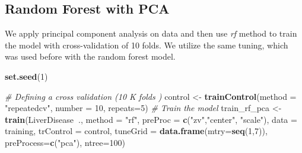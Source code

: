 \documentclass[]{article}
\newenvironment{Shaded}{\begin{snugshade}}{\end{snugshade}}
\newcommand{\CommentTok}[1]{\textcolor[rgb]{0.56,0.35,0.01}{\textit{#1}}}
\newcommand{\DataTypeTok}[1]{\textcolor[rgb]{0.13,0.29,0.53}{#1}}
\newcommand{\DecValTok}[1]{\textcolor[rgb]{0.00,0.00,0.81}{#1}}
\newcommand{\KeywordTok}[1]{\textcolor[rgb]{0.13,0.29,0.53}{\textbf{#1}}}
\newcommand{\NormalTok}[1]{#1}
\newcommand{\OperatorTok}[1]{\textcolor[rgb]{0.81,0.36,0.00}{\textbf{#1}}}
\newcommand{\StringTok}[1]{\textcolor[rgb]{0.31,0.60,0.02}{#1}}
\begin{document}
\subsection{Random Forest with PCA}

We apply principal component analysis on data and then use \emph{rf}
method to train the model with cross-validation of 10 folds. We utilize
the same tuning, which was used before with the random forest model.

\begin{Shaded}
\begin{Highlighting}[]
\KeywordTok{set.seed}\NormalTok{(}\DecValTok{1}\NormalTok{)}

\CommentTok{# Defining a cross validation (10 K folds )}
\NormalTok{control <-}\StringTok{ }\KeywordTok{trainControl}\NormalTok{(}\DataTypeTok{method =} \StringTok{"repeatedcv"}\NormalTok{, }\DataTypeTok{number =} \DecValTok{10}\NormalTok{, }\DataTypeTok{repeats=}\DecValTok{5}\NormalTok{)}
\CommentTok{# Train the model}
\NormalTok{train_rf_pca <-}\StringTok{ }\KeywordTok{train}\NormalTok{(LiverDisease}\OperatorTok{~}\NormalTok{.,}
                     \DataTypeTok{method =} \StringTok{"rf"}\NormalTok{,}
                     \DataTypeTok{preProc =} \KeywordTok{c}\NormalTok{(}\StringTok{"zv"}\NormalTok{,}\StringTok{"center"}\NormalTok{, }\StringTok{"scale"}\NormalTok{),}
                     \DataTypeTok{data =}\NormalTok{ training,}
                     \DataTypeTok{trControl =}\NormalTok{ control,}
                     \DataTypeTok{tuneGrid =} \KeywordTok{data.frame}\NormalTok{(}\DataTypeTok{mtry=}\KeywordTok{seq}\NormalTok{(}\DecValTok{1}\NormalTok{,}\DecValTok{7}\NormalTok{)),}
                     \DataTypeTok{preProcess=}\KeywordTok{c}\NormalTok{(}\StringTok{"pca"}\NormalTok{),}
                     \DataTypeTok{ntree=}\DecValTok{100}\NormalTok{)}
\end{Highlighting}
\end{Shaded}
\end{document}
